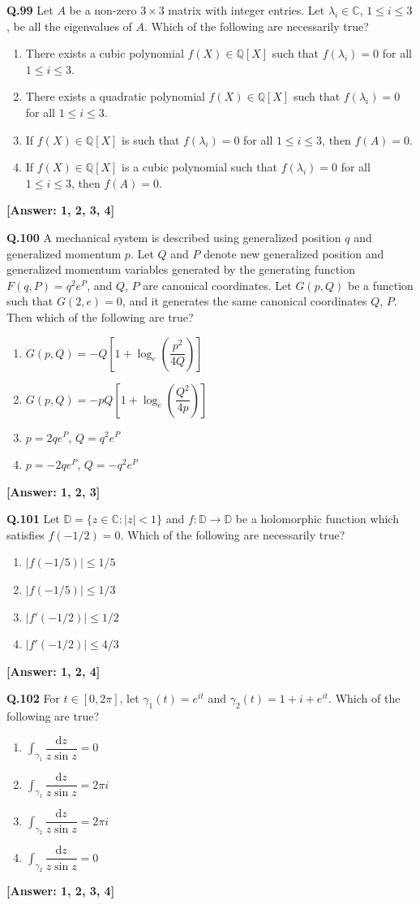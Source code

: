 \documentclass[12pt,a4paper]{article}
\newcommand{\ans}[1]{\quad\textcolor{anscolor}{\textbf{[Answer: #1]}}}
\begin{document}
\textbf{Q.99} Let $A$ be a non-zero $3\times3$ matrix with integer entries. Let $\lambda_i\in\mathbb{C}$, $1\le i\le3$, be all the eigenvalues of $A$. Which of the following are necessarily true?
\begin{enumerate}[label=\arabic*.]
\item There exists a cubic polynomial $f(X)\in\mathbb{Q}[X]$ such that $f(\lambda_i)=0$ for all $1\le i\le3$.
\item There exists a quadratic polynomial $f(X)\in\mathbb{Q}[X]$ such that $f(\lambda_i)=0$ for all $1\le i\le3$.
\item If $f(X)\in\mathbb{Q}[X]$ is such that $f(\lambda_i)=0$ for all $1\le i\le3$, then $f(A)=0$.
\item If $f(X)\in\mathbb{Q}[X]$ is a cubic polynomial such that $f(\lambda_i)=0$ for all $1\le i\le3$, then $f(A)=0$.
\end{enumerate}\ans{1, 2, 3, 4}

\textbf{Q.100} A mechanical system is described using generalized position $q$ and generalized momentum $p$. Let $Q$ and $P$ denote new generalized position and generalized momentum variables generated by the generating function $F(q,P)=q^2e^P$, and $Q$, $P$ are canonical coordinates. Let $G(p,Q)$ be a function such that $G(2,e)=0$, and it generates the same canonical coordinates $Q$, $P$. Then which of the following are true?
\begin{enumerate}[label=\arabic*.]
\item $G(p,Q)=-Q\!\left[1+\log_e\!\left(\dfrac{p^2}{4Q}\right)\right]$
\item $G(p,Q)=-pQ\!\left[1+\log_e\!\left(\dfrac{Q^2}{4p}\right)\right]$
\item $p=2qe^P$, $Q=q^2e^P$
\item $p=-2qe^P$, $Q=-q^2e^P$
\end{enumerate}\ans{1, 2, 3}

\textbf{Q.101} Let $\mathbb{D}=\{z\in\mathbb{C}:|z|<1\}$ and $f:\mathbb{D}\to\mathbb{D}$ be a holomorphic function which satisfies $f(-1/2)=0$. Which of the following are necessarily true?
\begin{enumerate}[label=\arabic*.]
\item $|f(-1/5)|\le1/5$ \item $|f(-1/5)|\le1/3$
\item $|f'(-1/2)|\le1/2$ \item $|f'(-1/2)|\le4/3$
\end{enumerate}\ans{1, 2, 4}

\textbf{Q.102} For $t\in[0,2\pi]$, let $\gamma_1(t)=e^{it}$ and $\gamma_2(t)=1+i+e^{it}$. Which of the following are true?
\begin{enumerate}[label=\arabic*.]
\item $\displaystyle\int_{\gamma_1}\dfrac{\mathrm{d}z}{z\sin z}=0$
\item $\displaystyle\int_{\gamma_1}\dfrac{\mathrm{d}z}{z\sin z}=2\pi i$
\item $\displaystyle\int_{\gamma_2}\dfrac{\mathrm{d}z}{z\sin z}=2\pi i$
\item $\displaystyle\int_{\gamma_2}\dfrac{\mathrm{d}z}{z\sin z}=0$
\end{enumerate}\ans{1, 2, 3, 4}
\end{document}
